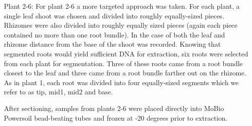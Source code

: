 Plant 2-6: For plant 2-6 a more targeted approach was taken. For each plant, a single leaf shoot was chosen and divided into roughly equally-sized pieces. Rhizomes were also divided into roughly equally sized pieces (again each piece contained no more than one root bundle). In the case of both the leaf and rhizome distance from the base of the shoot was recorded. Knowing that segmented roots would yield sufficient DNA for extraction, six roots were selected from each plant for segmentation. Three of these roots came from a root bundle closest to the leaf and three came from a root bundle farther out on the rhizome. As in plant 1, each root was divided into four equally-sized segments which we refer to as tip, mid1, mid2 and base.

After sectioning, samples from plants 2-6 were placed directly into MoBio Powersoil bead-beating tubes and frozen at -20 degrees prior to extraction.
    